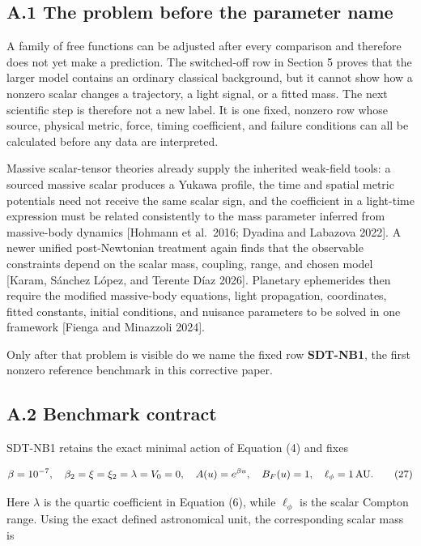 \documentclass[
  american,
  11pt,
  letterpaper,
]{article}
\begin{document}
\subsection{A.1 The problem before the parameter name}\label{a.1-the-problem-before-the-parameter-name}

A family of free functions can be adjusted after every comparison and therefore does not yet make a prediction. The switched-off row in Section 5 proves that the larger model contains an ordinary classical background, but it cannot show how a nonzero scalar changes a trajectory, a light signal, or a fitted mass. The next scientific step is therefore not a new label. It is one fixed, nonzero row whose source, physical metric, force, timing coefficient, and failure conditions can all be calculated before any data are interpreted.

Massive scalar-tensor theories already supply the inherited weak-field tools: a sourced massive scalar produces a Yukawa profile, the time and spatial metric potentials need not receive the same scalar sign, and the coefficient in a light-time expression must be related consistently to the mass parameter inferred from massive-body dynamics {[}Hohmann et al.~2016; Dyadina and Labazova 2022{]}. A newer unified post-Newtonian treatment again finds that the observable constraints depend on the scalar mass, coupling, range, and chosen model {[}Karam, Sánchez López, and Terente Díaz 2026{]}. Planetary ephemerides then require the modified massive-body equations, light propagation, coordinates, fitted constants, initial conditions, and nuisance parameters to be solved in one framework {[}Fienga and Minazzoli 2024{]}.

Only after that problem is visible do we name the fixed row \textbf{SDT-NB1}, the first nonzero reference benchmark in this corrective paper.

\subsection{A.2 Benchmark contract}\label{a.2-benchmark-contract}

SDT-NB1 retains the exact minimal action of Equation (4) and fixes

\begin{equation}
\beta=10^{-7},\quad
\beta_2=\xi=\xi_2=\lambda=V_0=0,\quad
A(u)=e^{\beta u},\quad
B_F(u)=1,\quad
\ell_\phi=1\,{\rm AU}.
\tag{27}
\end{equation}

Here \(\lambda\) is the quartic coefficient in Equation (6), while \(\ell_\phi\) is the scalar Compton range. Using the exact defined astronomical unit, the corresponding scalar mass is
\end{document}
